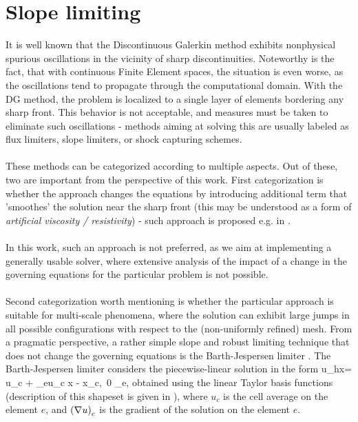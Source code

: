 \section{Slope limiting}
It is well known \cite{dolejsi2015} that the Discontinuous Galerkin method exhibits nonphysical spurious oscillations in the vicinity of sharp discontinuities. Noteworthy is the fact, that with continuous Finite Element spaces, the situation is even worse, as the oscillations tend to propagate through the computational domain. With the DG method, the problem is localized to a single layer of elements bordering any sharp front. This behavior is not acceptable, and measures must be taken to eliminate such oscillations - methods aiming at solving this are usually labeled as flux limiters, slope limiters, or shock capturing schemes.
\paragraph{}
These methods can be categorized according to multiple aspects. Out of these, two are important from the perspective of this work. First categorization is whether the approach changes the equations by introducing additional term that 'smoothes' the solution near the sharp front (this may be understood as a form of \textit{artificial viscosity / resistivity}) - such approach is proposed e.g. in \cite{DENNER201759}.
\paragraph{}
In this work, such an approach is not preferred, as we aim at implementing a generally usable solver, where extensive analysis of the impact of a change in the governing equations for the particular problem is not possible.
\paragraph{}
Second categorization worth mentioning is whether the particular approach is suitable for multi-scale phenomena, where the solution can exhibit large jumps in all possible configurations with respect to the (non-uniformly refined) mesh. From a pragmatic perspective, a rather simple slope and robust limiting technique that does not change the governing equations is the Barth-Jespersen limiter \cite{barthJespersen}.
The Barth-Jespersen limiter considers the piecewise-linear solution in the form
\be
\label{slopeLimSln}
u_h\lo x\ro = u_c + \alpha_e\lo\nabla u\ro_c \cdot \lo x - x_c\ro,\ 0 \leq \alpha_e,
\ee
obtained using the linear Taylor basis functions (description of this shapeset is given in \cite{KuzminVertex}), where $u_c$ is the cell average on the element $e$, and $\left(\nabla u\right)_c$ is the gradient of the solution on the element $e$.
